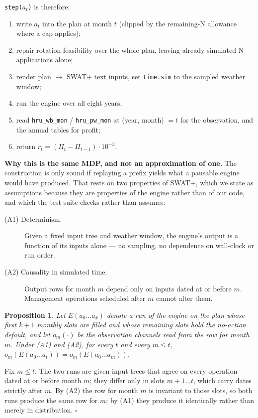 \documentclass[a4paper,fleqn]{cas-sc}
\newtheorem{theorem}{Proposition}
\begin{document}
\noindent\texttt{step($a_t$)} is therefore:

\begin{enumerate}
\item write $a_t$ into the plan at month $t$ (clipped by the remaining-N allowance where
a cap applies);
\item repair rotation feasibility over the whole plan, leaving already-simulated N
applications alone;
\item render plan $\rightarrow$ SWAT+ text inputs, set \texttt{time.sim} to the sampled
weather window;
\item run the engine over all eight years;
\item read \texttt{hru\_wb\_mon} / \texttt{hru\_pw\_mon} at (year, month) $= t$ for the
observation, and the annual tables for profit;
\item return $r_t = (\Pi_t - \Pi_{t-1}) \cdot 10^{-3}$.
\end{enumerate}

\textbf{Why this is the same MDP, and not an approximation of one.} The construction is
only sound if replaying a prefix yields what a pausable engine would have produced. That
rests on two properties of SWAT+, which we state as assumptions because they are
properties of the engine rather than of our code, and which the test suite checks rather
than assumes:

\begin{description}
\item[(A1) Determinism.] Given a fixed input tree and weather window, the engine's
output is a function of its inputs alone --- no sampling, no dependence on wall-clock or
run order.
\item[(A2) Causality in simulated time.] Output rows for month $m$ depend only on inputs
dated at or before $m$. Management operations scheduled after $m$ cannot alter them.
\end{description}

\begin{theorem}\label{prop:prefix}
Let $E(a_0 \ldots a_k)$ denote a run of the engine on the plan whose first $k+1$ monthly
slots are filled and whose remaining slots hold the no-action default, and let
$o_m(\cdot)$ be the observation channels read from the row for month $m$. Under (A1) and
(A2), for every $t$ and every $m \leq t$,
$o_m(E(a_0 \ldots a_t)) = o_m(E(a_0 \ldots a_m))$.
\end{theorem}

\begin{pf}
Fix $m \leq t$. The two runs are given input trees that agree on every operation dated
at or before month $m$; they differ only in slots $m+1 \ldots t$, which carry dates
strictly after $m$. By (A2) the row for month $m$ is invariant to those slots, so both
runs produce the same row for $m$; by (A1) they produce it identically rather than
merely in distribution. \hfill$\square$
\end{pf}
\end{document}
